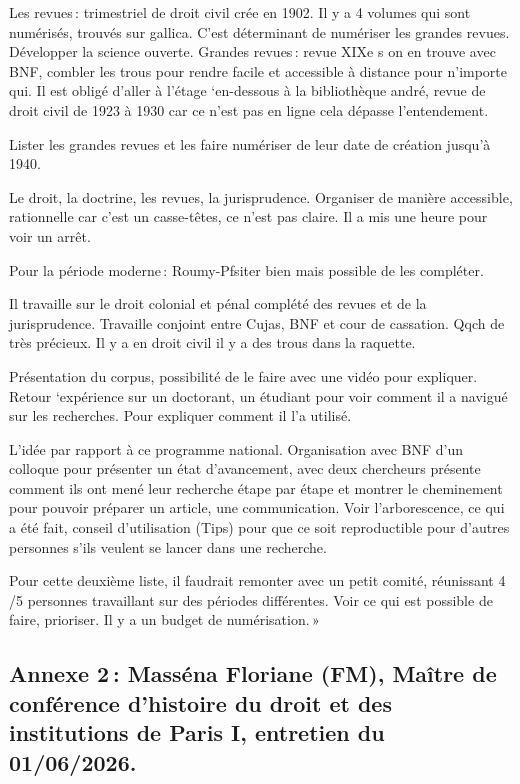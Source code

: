 Les revues : trimestriel de droit civil crée en 1902. Il y a 4 volumes qui sont numérisés, trouvés sur gallica. C’est déterminant de numériser les grandes revues. Développer la science ouverte. Grandes revues : revue XIXe s on en trouve avec BNF, combler les trous pour rendre facile et accessible à distance pour n’importe qui. Il est obligé d’aller à l’étage ‘en-dessous à la bibliothèque andré, revue de droit civil de 1923 à 1930 car ce n’est pas en ligne cela dépasse l’entendement. 

Lister les grandes revues et les faire numériser de leur date de création jusqu’à 1940.  

Le droit, la doctrine, les revues, la jurisprudence. Organiser de manière accessible, rationnelle car c’est un casse-têtes, ce n’est pas claire. Il a mis une heure pour voir un arrêt.  

Pour la période moderne : Roumy-Pfsiter bien mais possible de les compléter.  

Il travaille sur le droit colonial et pénal complété des revues et de la jurisprudence. Travaille conjoint entre Cujas, BNF et cour de cassation. Qqch de très précieux. Il y a en droit civil il y a des trous dans la raquette.  

Présentation du corpus, possibilité de le faire avec une vidéo pour expliquer. Retour ‘expérience sur un doctorant, un étudiant pour voir comment il a navigué sur les recherches. Pour expliquer comment il l’a utilisé.  

L’idée par rapport à ce programme national. Organisation avec BNF d’un colloque pour présenter un état d’avancement, avec deux chercheurs présente comment ils ont mené leur recherche étape par étape et montrer le cheminement pour pouvoir préparer un article, une communication. Voir l’arborescence, ce qui a été fait, conseil d’utilisation (Tips) pour que ce soit reproductible pour d’autres personnes s’ils veulent se lancer dans une recherche. 

Pour cette deuxième liste, il faudrait remonter avec un petit comité, réunissant 4 /5 personnes travaillant sur des périodes différentes. Voir ce qui est possible de faire, prioriser. Il y a un budget de numérisation. » 



\subsection*{Annexe 2 : Masséna Floriane (FM), Maître de conférence d’histoire du droit et des institutions de Paris I, entretien du 01/06/2026.}  


